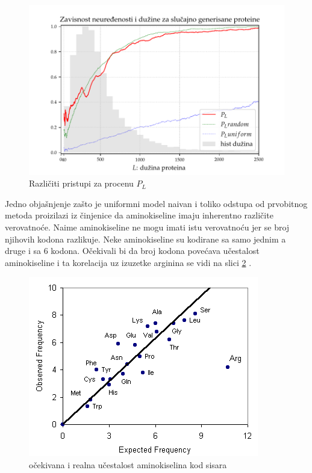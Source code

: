 \begin{figure}[th]
\centering
\includegraphics[]{../plots/PL_F_cmp}
\decoRule
\caption{Različiti pristupi za procenu $P_L$}
\label{fig:PL2}
\end{figure}


Jedno objašnjenje zašto je uniformni model naivan i toliko odstupa od
prvobitnog metoda proizilazi iz činjenice da aminokiseline imaju inherentno
različite verovatnoće. Naime  aminokiseline ne mogu  imati istu
verovatnoću jer se  broj njihovih kodona razlikuje. Neke aminokiseline
su kodirane sa samo jednim a druge i sa 6 kodona. Očekivali bi da broj kodona
povećava učestalost aminokiseline i ta korelacija uz izuzetke arginina se vidi
na slici
\ref{fig:aminoacid} \parencite{AKfrekvencija}.

\begin{figure}[th]
\centering
\includegraphics[scale=0.7]{Figures/aminoacid}
\decoRule
\caption{očekivana i realna učestalost  aminokiselina kod sisara}
\label{fig:aminoacid}
\end{figure}



